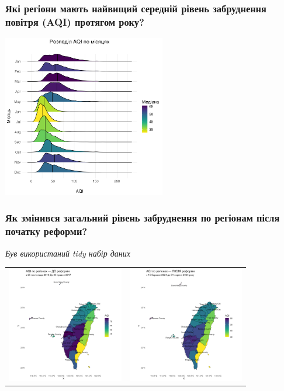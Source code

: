 \documentclass{beamer}
\begin{document}
\begin{frame}
  \frametitle{Які регіони мають найвищий середній рівень забруднення повітря (AQI) протягом року?}

  \begin{center}
    \includegraphics[height=2.8in]{plots/question4/seasonal_change_ridgeline.png}
  \end{center}
\end{frame}


\begin{frame}
  \frametitle{Як змінився загальний рівень забруднення по регіонам після початку реформи?}

  \textit{Був використаний tidy набір даних}

  \begin{center}
    \begin{tabular}{cc}
      \includegraphics[height=2in]{plots/question5/map_before_reform.png} &
      \includegraphics[height=2in]{plots/question5/map_after_reform.png}
    \end{tabular}
  \end{center}
\end{frame}
\end{document}
